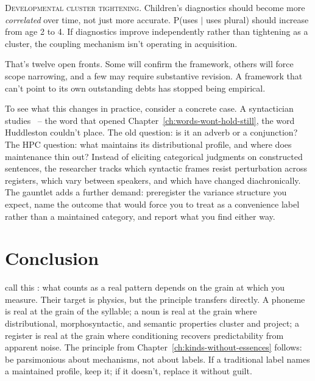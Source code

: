\textsc{Developmental cluster tightening}. Children's diagnostics should become more \emph{correlated} over time, not just more accurate. P(uses  $|$ uses plural) should increase from age 2 to 4. If diagnostics improve independently rather than tightening as a cluster, the coupling mechanism isn't operating in acquisition.

That's twelve open fronts. Some will confirm the framework, others will force scope narrowing, and a few may require substantive revision. A framework that can't point to its own outstanding debts has stopped being empirical.

To see what this changes in practice, consider a concrete case. A syntactician studies ~-- the word that opened Chapter~\ref{ch:words-wont-hold-still}, the word Huddleston couldn't place. The old question: is it an adverb or a conjunction? The HPC question: what maintains its distributional profile, and where does maintenance thin out? Instead of eliciting categorical judgments on constructed sentences, the researcher tracks which syntactic frames resist perturbation across registers, which vary between speakers, and which have changed diachronically. The gauntlet adds a further demand: preregister the variance structure you expect, name the outcome that would force you to treat  as a convenience label rather than a maintained category, and report what you find either way.

\section{Conclusion}
\label{sec:17:zipper-at-scale}

\textcite{ladyman2007} call this : what counts as a real pattern depends on the grain at which you measure. Their target is physics, but the principle transfers directly. A phoneme is real at the grain of the syllable; a noun is real at the grain where distributional, morphosyntactic, and semantic properties cluster and project; a register is real at the grain where conditioning recovers predictability from apparent noise. The  principle from Chapter~\ref{ch:kinds-without-essences} follows: be parsimonious about mechanisms, not about labels. If a traditional label names a maintained profile, keep it; if it doesn't, replace it without guilt.

